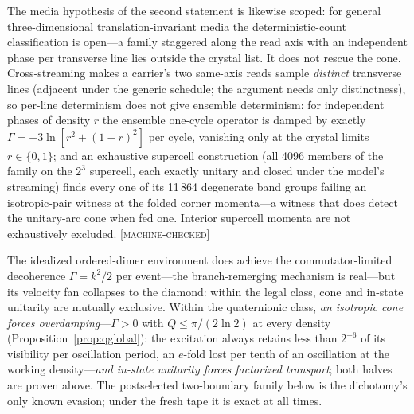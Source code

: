 \documentclass[aps,prd,twocolumn,superscriptaddress,nofootinbib,floatfix]{revtex4-2}
\newcommand{\evM}{\textnormal{\textsc{[machine-checked]}}}
\begin{document}
The media hypothesis of the second statement is likewise scoped: for
general three-dimensional translation-invariant media the
deterministic-count classification is open---a family staggered along
the read axis with an independent phase per transverse line lies
outside the crystal list. It does not rescue the cone. Cross-streaming
makes a carrier's two same-axis reads sample \emph{distinct} transverse
lines (adjacent under the generic schedule; the argument needs only
distinctness), so per-line determinism does not give ensemble
determinism: for
independent phases of density $r$ the ensemble one-cycle operator is
damped by exactly $\Gamma=-3\ln[r^2+(1-r)^2]$ per cycle, vanishing only
at the crystal limits $r\in\{0,1\}$; and an exhaustive supercell
construction (all 4096 members of the family on the $2^3$ supercell,
each exactly unitary and closed under the model's streaming) finds
every one of its 11\,864 degenerate band groups failing an
isotropic-pair witness at the folded corner momenta---a witness that
does detect the unitary-arc cone when fed one. Interior supercell
momenta are not exhaustively excluded. \evM{}

The idealized ordered-dimer environment does achieve the commutator-limited
decoherence $\Gamma=k^2/2$ per event---the branch-remerging mechanism is
real---but its velocity fan collapses to the diamond: within the legal
class, cone and in-state unitarity are mutually exclusive. Within the
quaternionic class,
\emph{an isotropic cone forces overdamping}---$\Gamma>0$ with
$Q\le\pi/(2\ln2)$ at every density (Proposition~\ref{prop:qglobal}):
the excitation always retains less than $2^{-6}$ of its visibility per
oscillation period, an $e$-fold lost per tenth of an oscillation at
the working density---\emph{and in-state unitarity forces factorized
transport}; both halves are proven above. The postselected two-boundary
family below is the dichotomy's only known evasion; under the fresh
tape it is exact at all times.
\end{document}

